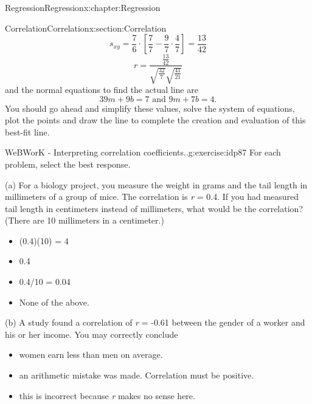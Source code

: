 \documentclass[oneside,10pt,]{book}
\numberwithin{equation}{section}
\begin{document}
\begin{chapterptx}{Regression}{}{Regression}{}{}{x:chapter:Regression}
\begin{sectionptx}{Correlation}{}{Correlation}{}{}{x:section:Correlation}
\begin{equation*}
\end{equation*}
%
\begin{equation*}
s_{xy} = \frac{7}{6} \cdot \left [ \frac{7}{7} - \frac{9}{7} \cdot \frac{4}{7} \right ] = \frac{13}{42} 
\end{equation*}
%
\begin{equation*}
r = \frac{\frac{13}{42}}{\sqrt{\frac{32}{7}} \sqrt{\frac{41}{21}}}
\end{equation*}
and the normal equations to find the actual line are%
\begin{equation*}
39m + 9 b = 7 \text{  and  } 9m + 7b = 4.
\end{equation*}
You should go ahead and simplify these values, solve the system of equations, plot the points and draw the line to complete the creation and evaluation of this best-fit line.%
\begin{inlineexercise}{WeBWorK - Interpreting correlation coefficients..}{g:exercise:idp87}%
For each problem, select the best response.%
\par
(a) For a biology project, you measure the weight in grams and the tail length in millimeters of a group of mice. The correlation is \emph{r} = 0.4. If you had measured tail length in centimeters instead of millimeters, what would be the correlation? (There are 10 millimeters in a centimeter.)%
\par
\begin{itemize}[label=$\odot$,leftmargin=3em,]
\item{}(0.4)(10) = 4%

\item{}0.4%

\item{}0.4\slash{}10 = 0.04%

\item{}None of the above.%

\end{itemize}
%
\par
(b) A study found a correlation of \emph{r} = -0.61 between the gender of a worker and his or her income.  You may correctly conclude%
\par
\begin{itemize}[label=$\odot$,leftmargin=3em,]
\item{}women earn less than men on average.%

\item{}an arithmetic mistake was made.  Correlation must be positive.%

\item{}this is incorrect because \emph{r} makes no sense here.%


\end{itemize}
\end{inlineexercise}
\end{sectionptx}
\end{chapterptx}
\end{document}
